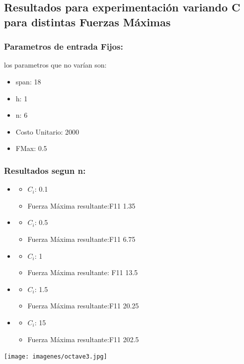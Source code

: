\subsection{Resultados para experimentaci\'on variando C para distintas Fuerzas Máximas}
\subsubsection{Parametros de entrada Fijos:}
los parametros que no var\'ian son:
  \begin{itemize}
      \item span: 18
      \item h: 1
      \item n: 6
      \item Costo Unitario: 2000
      \item FMax: 0.5
  \end{itemize}
\subsubsection{Resultados segun n:}
\begin{itemize}
    \item 
      \begin{itemize}
	\item $C_i$: 0.1
	\item Fuerza M\'axima resultante:F11 1.35
      \end{itemize}
    \item 
      \begin{itemize}
	\item $C_i$: 0.5
	\item Fuerza M\'axima resultante:F11 6.75
      \end{itemize}
    \item 
      \begin{itemize}
	\item $C_i$: 1
	\item Fuerza M\'axima resultante: F11 13.5
      \end{itemize}
    \item 
      \begin{itemize}
	\item $C_i$: 1.5
	\item Fuerza M\'axima resultante:F11 20.25
      \end{itemize}
    \item 
      \begin{itemize}
	\item $C_i$: 15
	\item Fuerza M\'axima resultante:F11 202.5
      \end{itemize}
\end{itemize}
  \begin{center}
 \texttt{[image: imagenes/octave3.jpg]}
\end{center}
